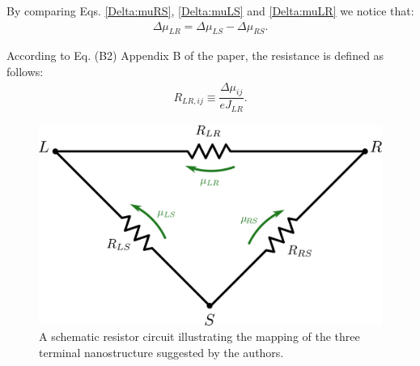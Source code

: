 By comparing Eqs. \eqref{Delta:muRS}, \eqref{Delta:muLS} and \eqref{Delta:muLR} we notice that:
\begin{align}\label{chem:pots}
\Delta\mu_{LR}=\Delta\mu_{LS}-\Delta\mu_{RS}.
\end{align}

According to Eq. (B2) Appendix B of the paper, the resistance is defined as follows:
\begin{align}\label{RLRij:def}
R_{LR,ij}\equiv\dfrac{\Delta\mu_{ij}}{eJ_{LR}}.
\end{align}

\begin{figure}[h]
\centering
\includegraphics[scale=0.5]{triangle.png}
\caption{\label{fig1} A schematic resistor circuit illustrating the mapping of the three terminal nanostructure suggested by the authors.}
\end{figure}


